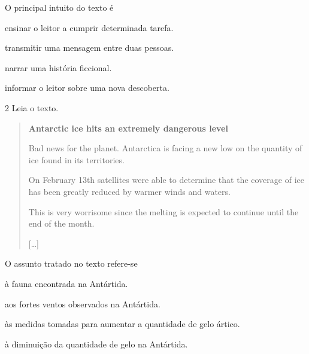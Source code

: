 O principal intuito do texto é

\begin{escolha}
\item ensinar o leitor a cumprir determinada tarefa.

\item transmitir uma mensagem entre duas pessoas.

\item narrar uma história ficcional.

\item informar o leitor sobre uma nova descoberta.
\end{escolha}


\num{2} Leia o texto.

\begin{quote}
\textbf{Antarctic ice hits an extremely dangerous level}

Bad news for the planet. Antarctica is facing a new low on the quantity of ice found in its territories.

On February 13th satellites were able to determine that the coverage of ice has been greatly reduced by warmer winds and waters.

This is very worrisome since the melting is expected to continue until the end of the month.  

{[}\ldots{}{]}

\end{quote}

O assunto tratado no texto refere-se

\begin{escolha}
\item à fauna encontrada na Antártida.

\item aos fortes ventos observados na Antártida.

\item às medidas tomadas para aumentar a quantidade de gelo ártico.

\item à diminuição da quantidade de gelo na Antártida.
\end{escolha}

